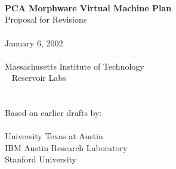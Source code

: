\documentclass[10pt]{article}
\begin{document}
  \begin{titlepage}
    \begin{center}
      {\LARGE
	~ \\ ~ \\ ~ \\ ~ \\ ~ \\ ~ \\ ~ \\ ~ \\
	{\bf PCA Morphware Virtual Machine Plan} \\ 
	Proposal for Revisions \\ ~ \\ 
      }
      {\Large
	January 6, 2002 \\ ~ \\
      }
      {\large
	Massachusetts Institute of Technology \\ ~ Reservoir Labs \\ ~ \\ ~ \\ 
	Based on earlier drafts by: \\ ~ \vspace{-8pt} \\
	University Texas at Austin \\ IBM Austin Research Laboratory \\ Stanford University
      }
    \end{center}
  \end{titlepage}

  \newcommand{\mt}[1]{\mbox{\it #1}}
  \newcommand{\todo}[1]{\framebox{\bf #1}}
  \newcommand{\sss}[1]{\medskip \noindent {\bf #1} \smallskip}
  \newcommand{\ssss}[1]{\medskip \noindent {\bf #1:}}

  
  
  

% 
% 
  
\end{document}
